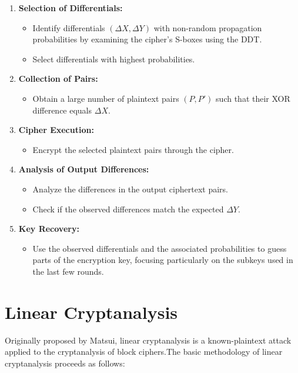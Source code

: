 \begin{enumerate}
    \item \textbf{Selection of Differentials:}
    \begin{itemize}
        \item Identify differentials $(\Delta X, \Delta Y)$ with non-random propagation probabilities by examining the cipher's S-boxes using the DDT.
        \item Select differentials with highest probabilities.
    \end{itemize}

    \item \textbf{Collection of Pairs:}
    \begin{itemize}
        \item Obtain a large number of plaintext pairs $(P, P')$ such that their XOR difference equals $ \Delta X$.
    \end{itemize}

    \item \textbf{Cipher Execution:}
    \begin{itemize}
        \item Encrypt the selected plaintext pairs through the cipher.
    \end{itemize}

    \item \textbf{Analysis of Output Differences:}
    \begin{itemize}
        \item Analyze the differences in the output ciphertext pairs.
        \item Check if the observed differences match the expected $\Delta Y$.
    \end{itemize}

    \item \textbf{Key Recovery:}
    \begin{itemize}
        \item Use the observed differentials and the associated probabilities to guess parts of the encryption key, focusing particularly on the subkeys used in the last few rounds.
    \end{itemize}
\end{enumerate}


\section{Linear Cryptanalysis}
Originally proposed by Matsui, linear cryptanalysis \cite{matsui1993linear} is a known-plaintext attack applied to the cryptanalysis of block ciphers.The basic methodology of linear cryptanalysis proceeds as follows:

